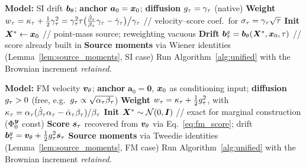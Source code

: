 \begin{algorithm}[ht]
\caption{Sampler 1 -- Stochastic interpolant SDE (native diffusion)}
\label{alg:si_sde}
\begin{algorithmic}[1]
\STATE \textbf{Model:} SI drift $\bm{b}_\theta$; \textbf{anchor} $\bm a_0=\boldsymbol{x}_0$; \textbf{diffusion} $g_\tau=\gamma_\tau$ (native)
\STATE \textbf{Weight} $w_\tau = \kappa_\tau + \tfrac12\gamma_\tau^2 = \gamma_\tau^2\tau\big(\tfrac{\dot\beta_\tau}{\beta_\tau}\gamma_\tau-\dot\gamma_\tau\big)\big/\gamma_\tau$ \hfill // velocity--score coef.\ for $\sigma_\tau=\gamma_\tau\sqrt\tau$
\STATE \textbf{Init} $\boldsymbol{X}^{*}\leftarrow\boldsymbol{x}_0$ \hfill // point-mass source; reweighting vacuous
\STATE \textbf{Drift} $\bm{b}^{g}_\tau=\bm{b}_\theta(\boldsymbol{X}^{*},\boldsymbol{x}_0,\tau)$ \hfill // score already built in
\STATE \textbf{Source moments} via Wiener identities (Lemma~\ref{lem:source_moments}, SI case)
\STATE Run Algorithm~\ref{alg:unified} with the Brownian increment \emph{retained}.
\end{algorithmic}
\end{algorithm}

\begin{algorithm}[ht]
\caption{Sampler 2 -- Flow matching SDE (lifted diffusion)}
\label{alg:fm_sde}
\begin{algorithmic}[1]
\STATE \textbf{Model:} FM velocity $\bm{v}_\theta$; \textbf{anchor} $\bm a_0=\bm 0$, $\boldsymbol{x}_0$ as conditioning input; \textbf{diffusion} $g_\tau>0$ (free, e.g.\ $g_\tau\propto\sqrt{\alpha_\tau\beta_\tau}$)
\STATE \textbf{Weight} $w_\tau = \kappa_\tau + \tfrac12g_\tau^2$, with $\kappa_\tau=\alpha_\tau(\dot\beta_\tau\alpha_\tau-\dot\alpha_\tau\beta_\tau)/\beta_\tau$
\STATE \textbf{Init} $\boldsymbol{X}^{*}\sim\mathcal{N}(0,\bm{I})$ \hfill // exact for marginal construction ($\Phi_0^{\boldsymbol{y}}$ const)
\STATE \textbf{Score} $\bm{s}_\tau$ recovered from $\bm{v}_\theta$ via Eq.~\eqref{eq:fm_score}; drift $\bm{b}^{g}_\tau=\bm{v}_\theta+\tfrac12g_\tau^2\bm{s}_\tau$
\STATE \textbf{Source moments} via Tweedie identities (Lemma~\ref{lem:source_moments}, FM case)
\STATE Run Algorithm~\ref{alg:unified} with the Brownian increment \emph{retained}.
\end{algorithmic}
\end{algorithm}

